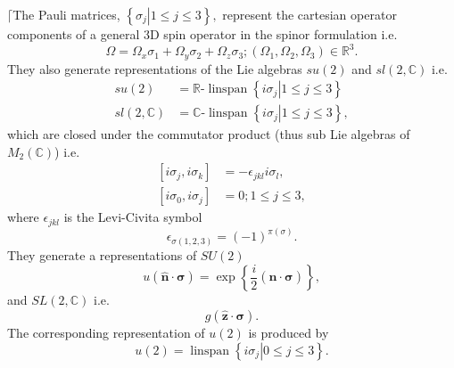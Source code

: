 \documentclass[aps,preprint]{revtex4}%
\begin{document}
$\lceil$The Pauli matrices, $\left\{  \left.  \mathbb{\sigma}_{j}\right\vert
1\leq j\leq3\right\}  ,$ represent the cartesian operator components of a
general 3D spin operator in the spinor formulation i.e.
\begin{equation}
\Omega=\Omega_{x}\mathbb{\sigma}_{1}+\Omega_{y}\mathbb{\sigma}_{2}+\Omega
_{z}\mathbb{\sigma}_{3};\left(  \Omega_{1},\Omega_{2},\Omega_{3}\right)
\in\mathbb{R}^{3}.
\end{equation}
They also generate representations of the Lie algebras $su(2)$ and $sl\left(
2,\mathbb{C}\right)  $ i.e.
\begin{align}
su(2)  &  =\mathbb{R}\text{-}\operatorname*{linspan}\left\{  \left.
i\sigma_{j}\right\vert 1\leq j\leq3\right\} \\
sl\left(  2,\mathbb{C}\right)   &  =\mathbb{C}\text{-}\operatorname*{linspan}%
\left\{  \left.  i\sigma_{j}\right\vert 1\leq j\leq3\right\}  ,
\end{align}
which are closed under the commutator product (thus sub Lie algebras of
$M_{2}\left(  \mathbb{C}\right)  $) i.e.
\begin{align}
\left[  i\sigma_{j},i\sigma_{k}\right]   &  =-\epsilon_{jkl}i\sigma_{l},\\
\left[  i\sigma_{0},i\sigma_{j}\right]   &  =0;1\leq j\leq3,
\end{align}
where $\epsilon_{jkl}$ is the Levi-Civita symbol
\begin{equation}
\epsilon_{\sigma\left(  1,2,3\right)  }=\left(  -1\right)  ^{\pi\left(
\sigma\right)  }.
\end{equation}
They generate a representations of $SU(2)$
\begin{equation}
u\left(  \widehat{\mathbf{n}}\cdot\mathbf{\sigma}\right)  =\exp\left\{
\frac{i}{2}\left(  \widehat{\mathbf{n}}\cdot\mathbf{\sigma}\right)  \right\}
,
\end{equation}
and $SL\left(  2,\mathbb{C}\right)  $ i.e.
\begin{equation}
g\left(  \widehat{\mathbf{z}}\cdot\mathbf{\sigma}\right)  .
\end{equation}
The corresponding representation of $u(2)$ is produced by
\begin{equation}
u(2)=\operatorname*{linspan}\left\{  \left.  i\sigma_{j}\right\vert 0\leq
j\leq3\right\}  .
\end{equation}
\end{document}
